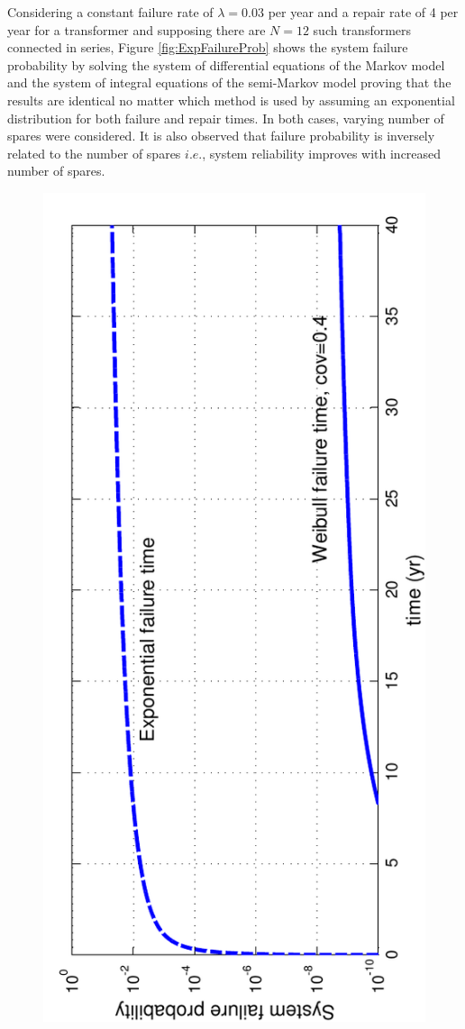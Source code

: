 \documentclass[letterpaper, 12pt]{article}
\begin{document}
Considering a constant failure rate of $\lambda=0.03$ per year and a repair rate of 4 per year for a transformer and supposing there are $N=12$ such transformers connected in series, Figure \ref{fig:ExpFailureProb} shows the system failure probability by solving the system of differential equations of the Markov model and the system of integral equations of the semi-Markov model proving that the results are identical no matter which method is used by assuming an exponential distribution for both failure and repair times. 
In both cases, varying number of spares were considered. It is also observed that failure probability is inversely related to the number of spares $i.e.$, system reliability improves with increased number of spares. 

\begin{figure}[h!] \centering
  \includegraphics[scale=0.8, angle=-90]{CompareWblExp}

\end{figure}
\end{document}
